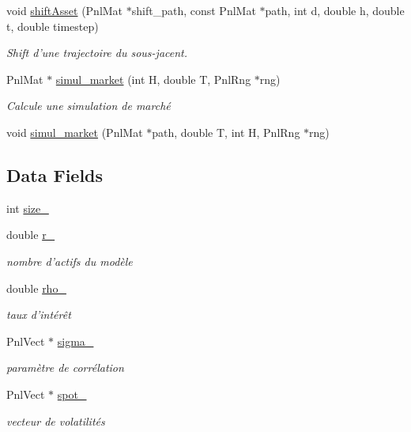 \begin{DoxyCompactItemize}
void \hyperlink{classBlackScholesModel_ac89a165e6d27cc12dd77627597f7f56d}{shift\-Asset} (Pnl\-Mat $\ast$shift\-\_\-path, const Pnl\-Mat $\ast$path, int d, double h, double t, double timestep)
\begin{DoxyCompactList}\small\item\em Shift d'une trajectoire du sous-\/jacent. \end{DoxyCompactList}\item 
Pnl\-Mat $\ast$ \hyperlink{classBlackScholesModel_a5cefb6798ecf3aad04d7c098846e9381}{simul\-\_\-market} (int H, double T, Pnl\-Rng $\ast$rng)
\begin{DoxyCompactList}\small\item\em Calcule une simulation de marché \end{DoxyCompactList}\item 
void \hyperlink{classBlackScholesModel_ad131019feab3bc199889b840d9d3c7c3}{simul\-\_\-market} (Pnl\-Mat $\ast$path, double T, int H, Pnl\-Rng $\ast$rng)
\end{DoxyCompactItemize}
\subsection*{Data Fields}
\begin{DoxyCompactItemize}
\item 
int \hyperlink{classBlackScholesModel_ab84e9318c0c1e8a50d5e2f9a70f1256e}{size\-\_\-}
\item 
double \hyperlink{classBlackScholesModel_a9b07eb1d8a7ada20e1a723ba19172644}{r\-\_\-}
\begin{DoxyCompactList}\small\item\em nombre d'actifs du modèle \end{DoxyCompactList}\item 
double \hyperlink{classBlackScholesModel_a1022a65929e3656f8990b7b0a63705ba}{rho\-\_\-}
\begin{DoxyCompactList}\small\item\em taux d'intérêt \end{DoxyCompactList}\item 
Pnl\-Vect $\ast$ \hyperlink{classBlackScholesModel_a745a2d85da5056b44bd88f37ee7b33e0}{sigma\-\_\-}
\begin{DoxyCompactList}\small\item\em paramètre de corrélation \end{DoxyCompactList}\item 
Pnl\-Vect $\ast$ \hyperlink{classBlackScholesModel_a6ce6853d5f0d65c8e0f07cdedca3e26a}{spot\-\_\-}
\begin{DoxyCompactList}\small\item\em vecteur de volatilités \end{DoxyCompactList}\end{DoxyCompactItemize}
